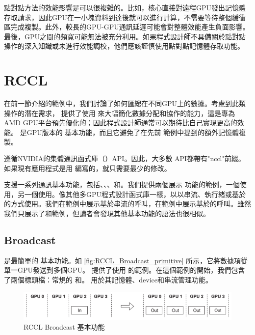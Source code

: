 點對點方法的效能影響是可以很複雜的。比如，核心直接對遠程GPU發出記憶體存取請求，因此GPU在一小塊資料到達後就可以進行計算，不需要等待整個緩衝區完成複製。此外，較長的GPU-GPU通訊延遲可能會對整體效能產生負面影響。最後，GPU之間的頻寬可能無法被充分利用。如果程式設計師不具備關於點對點操作的深入知識或未進行效能調校，他們應該謹慎使用點對點記憶體存取功能。

\section{RCCL}

在前一節介紹的範例中，我們討論了如何匯總在不同GPU上的數據。考慮到此類操作的潛在需求， 提供了使用 來大幅簡化數據分配和協作的能力，這是專為AMD GPU平台預先優化的；因此程式設計師通常可以期待比自己實現更高的效能。 是GPU版本的 基本功能，而且它避免了在先前 範例中提到的額外記憶體複製。

 遵循NVIDIA的集體通訊函式庫（）API。因此，大多數 API都帶有"nccl"前綴。如果現有應用程式是用 編寫的，就只需要最少的修改。

 支援一系列通訊基本功能，包括、、、和。我們提供兩個展示 功能的範例，一個使用，另一個使用。像其他多GPU程式設計函式庫一樣，以以串流、執行緒或基於的方式使用。我們在範例中展示基於串流的呼叫，在範例中展示基於的呼叫。雖然我們只展示了和範例，但讀者會發現其他基本功能的語法也很相似。

\subsection{Broadcast}

 是最簡單的 基本功能。如 \autoref{fig:RCCL_Broadcast_primitive} 所示，它將數據項從單一GPU發送到多個GPU。 提供了使用 的範例。在這個範例的開始，我們包含了兩個標頭檔：常規的 和。 用於其記憶體、device和串流管理功能。

\begin{figure}[h]
    \centering
    \includegraphics[width=0.75\linewidth]{FileAusiliari//Screenshots/Figure10-2.png}
    \caption{RCCL Broadcast 基本功能}
    \label{fig:RCCL_Broadcast_primitive}
\end{figure}

